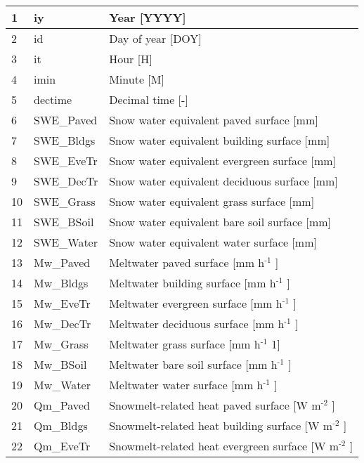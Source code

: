 \documentclass[letterpaper,10pt,english]{sphinxmanual}
\begin{document}
\begin{savenotes}
\begin{longtable}{|l|l|l|}
1
&
iy
&
Year {[}YYYY{]}
\\
\hline
2
&
id
&
Day of year {[}DOY{]}
\\
\hline
3
&
it
&
Hour {[}H{]}
\\
\hline
4
&
imin
&
Minute {[}M{]}
\\
\hline
5
&
dectime
&
Decimal time {[}-{]}
\\
\hline
6
&
SWE\_Paved
&
Snow water equivalent \textendash{} paved surface {[}mm{]}
\\
\hline
7
&
SWE\_Bldgs
&
Snow water equivalent \textendash{} building surface {[}mm{]}
\\
\hline
8
&
SWE\_EveTr
&
Snow water equivalent \textendash{} evergreen surface {[}mm{]}
\\
\hline
9
&
SWE\_DecTr
&
Snow water equivalent \textendash{} deciduous surface {[}mm{]}
\\
\hline
10
&
SWE\_Grass
&
Snow water equivalent \textendash{} grass surface {[}mm{]}
\\
\hline
11
&
SWE\_BSoil
&
Snow water equivalent \textendash{} bare soil surface {[}mm{]}
\\
\hline
12
&
SWE\_Water
&
Snow water equivalent \textendash{} water surface {[}mm{]}
\\
\hline
13
&
Mw\_Paved
&
Meltwater \textendash{} paved surface {[}mm h$^{\text{-1}}$ {]}
\\
\hline
14
&
Mw\_Bldgs
&
Meltwater \textendash{} building surface {[}mm h$^{\text{-1}}$ {]}
\\
\hline
15
&
Mw\_EveTr
&
Meltwater \textendash{} evergreen surface {[}mm h$^{\text{-1}}$ {]}
\\
\hline
16
&
Mw\_DecTr
&
Meltwater \textendash{} deciduous surface {[}mm h$^{\text{-1}}$ {]}
\\
\hline
17
&
Mw\_Grass
&
Meltwater \textendash{} grass surface {[}mm h$^{\text{-1}}$ 1{]}
\\
\hline
18
&
Mw\_BSoil
&
Meltwater \textendash{} bare soil surface {[}mm h$^{\text{-1}}$ {]}
\\
\hline
19
&
Mw\_Water
&
Meltwater \textendash{} water surface {[}mm h$^{\text{-1}}$ {]}
\\
\hline
20
&
Qm\_Paved
&
Snowmelt-related heat \textendash{} paved surface {[}W m$^{\text{-2}}$ {]}
\\
\hline
21
&
Qm\_Bldgs
&
Snowmelt-related heat \textendash{} building surface {[}W m$^{\text{-2}}$ {]}
\\
\hline
22
&
Qm\_EveTr
&
Snowmelt-related heat \textendash{} evergreen surface {[}W m$^{\text{-2}}$ {]}

\end{longtable}
\end{savenotes}
\end{document}
